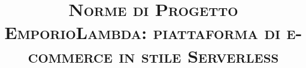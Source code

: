 


\newcommand{\docNome}{ Norme di Progetto }
\newcommand{\docVersione}{0.0.4}
\newcommand{\docNomeProgetto}{ EmporioLambda: piattaforma di e-commerce in stile Serverless }
\newcommand{\docStatus}{in redazione}
\newcommand{\docUso}{interno}
\newcommand{\docDescrizione}{
    \begin{center}
    Documento di definizione del \textit{Way of Working}
    \end{center}
}


\newcommand{\docRedattori}{
	Tutti i membri del gruppo
}
\newcommand{\docVerificatori}{
	TODO
}
\newcommand{\docApprovazione}{
    TODO
}

\newcommand{\nomeCorso}{
    Ingegneria del Software - Università degli Studi di Padova
}



\documentclass[11pt,a4paper,table]{article}

    


\title{ \hr \huge \textsc{\docNome} \\ 
        \vspace{11pt} \large \textsc{\docNomeProgetto} \hr}

\author{} %
\date{} %


 





\newpage
{}


\tableofcontents


\newpage







